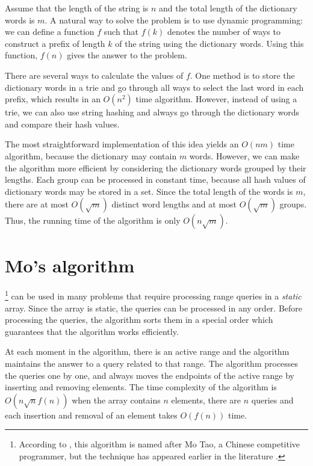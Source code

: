Assume that the length of the string is $n$
and the total length of the dictionary words is $m$.
A natural way to solve the problem is to use dynamic
programming: we can define a function $f$ such that
$f(k)$ denotes the number of ways to construct a prefix
of length $k$ of the string using the dictionary words.
Using this function, $f(n)$ gives the answer to the problem.

There are several ways to calculate the values of $f$.
One method is to store the dictionary words
in a trie and go through all ways to select the
last word in each prefix, which results in an $O(n^2)$ time algorithm.
However, instead of using a trie, we can also use string hashing
and always go through the dictionary words and compare their
hash values.

The most straightforward implementation of this idea
yields an $O(nm)$ time algorithm,
because the dictionary may contain $m$ words.
However, we can make the algorithm more efficient
by considering the dictionary words grouped by their lengths.
Each group can be processed in constant time,
because all hash values of dictionary words may be stored in a set.
Since the total length of the words is $m$,
there are at most $O(\sqrt m)$ distinct word lengths
and at most $O(\sqrt m)$ groups.
Thus, the running time of the algorithm is only $O(n \sqrt m)$.

\section{Mo's algorithm}


\footnote{According to \cite{cod15}, this algorithm
is named after Mo Tao, a Chinese competitive programmer, but
the technique has appeared earlier in the literature \cite{ken06}.}
can be used in many problems
that require processing range queries in 
a \emph{static} array.
Since the array is static, the queries can be
processed in any order.
Before processing the queries, the algorithm
sorts them in a special order which guarantees
that the algorithm works efficiently.

At each moment in the algorithm, there is an active
range and the algorithm maintains the answer
to a query related to that range.
The algorithm processes the queries one by one,
and always moves the endpoints of the
active range by inserting and removing elements.
The time complexity of the algorithm is
$O(n \sqrt n f(n))$ when the array contains
$n$ elements, there are $n$ queries
and each insertion and removal of an element
takes $O(f(n))$ time.

